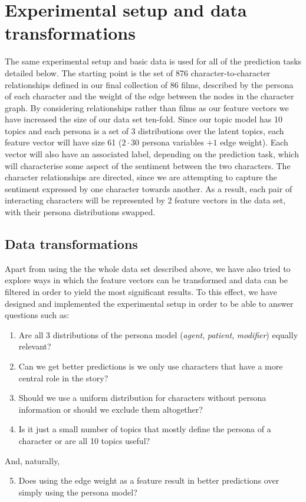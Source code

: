 \documentclass[bsc,frontabs,deptreport,singlespacing,parskip, twoside]{infthesis}
\begin{document}
\section{Experimental setup and data transformations}
The same experimental setup and basic data is used for all of the prediction tasks detailed below. The starting point is the set of 876 character-to-character relationships defined in our final collection of 86 films, described by the persona of each character and the weight of the edge between the nodes in the character graph. By considering relationships rather than films as our feature vectors we have increased the size of our data set ten-fold. Since our topic model has 10 topics and each persona is a set of 3 distributions over the latent topics, each feature vector will have size 61 ($2 \cdot 30$ persona variables $+ 1$ edge weight). Each vector will also have an associated label, depending on the prediction task, which will characterise some aspect of the sentiment between the two characters. The character relationships are directed, since we are attempting to capture the sentiment expressed by one character towards another. As a result, each pair of interacting characters will be represented by 2 feature vectors in the data set, with their persona distributions swapped.

\subsection{Data transformations}
Apart from using the the whole data set described above, we have also tried to explore ways in which the feature vectors can be transformed and data can be filtered in order to yield the most significant results. To this effect, we have designed and implemented the experimental setup in order to be able to answer questions such as:
\begin{enumerate}
	\item Are all 3 distributions of the persona model (\textit{agent}, \textit{patient}, \textit{modifier}) equally relevant?
	\item Can we get better predictions is we only use characters that have a more central role in the story?
	\item Should we use a uniform distribution for characters without persona information or should we exclude them altogether?
	\item Is it just a small number of topics that mostly define the persona of a character or are all 10 topics useful?
\end{enumerate}
And, naturally,
\begin{enumerate}
	\setcounter{enumi}{4}
	\item Does using the edge weight as a feature result in better predictions over simply using the persona model?
\end{enumerate}
\end{document}
